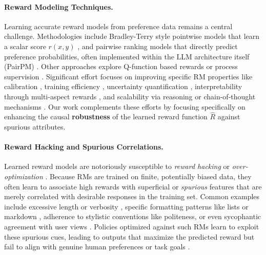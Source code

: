 \paragraph{Reward Modeling Techniques.}
Learning accurate reward models from preference data remains a central challenge. Methodologies include Bradley-Terry style pointwise models that learn a scalar score $r(x, y)$ \citep{bradley1952rank, ouyang2022training, bai2022training}, and pairwise ranking models that directly predict preference probabilities, often implemented within the LLM architecture itself (PairPM) \citep{liu2025pairwise, qin2023large}. Other approaches explore Q-function based rewards \citep{li2024process} or process supervision \citep{khalifa2025process}. Significant effort focuses on improving specific RM properties like calibration \citep{zhu2025charm, zhao2023slic}, training efficiency \citep{tunstall2023zephyr}, uncertainty quantification \citep{lou2024uncertainty}, interpretability through multi-aspect rewards \citep{wang2024interpretable, yang2024rewards}, and scalability via reasoning or chain-of-thought mechanisms \citep{zhao2025genprm}. Our work complements these efforts by focusing specifically on enhancing the causal \textbf{robustness} of the learned reward function $\hat{R}$ against spurious attributes.

\paragraph{Reward Hacking and Spurious Correlations.}
Learned reward models are notoriously susceptible to \textit{reward hacking} or \textit{over-optimization} \citep{gao2023scaling, skalse2022defining, pan2022effectsrewardmisspecificationmapping}. Because RMs are trained on finite, potentially biased data, they often learn to associate high rewards with superficial or \textit{spurious} features that are merely correlated with desirable responses in the training set. Common examples include excessive length or verbosity \citep{singhal2023long}, specific formatting patterns like lists or markdown \citep{zhang2024lists}, adherence to stylistic conventions like politeness, or even sycophantic agreement with user views \citep{denison2024sycophancy}. Policies optimized against such RMs learn to exploit these spurious cues, leading to outputs that maximize the predicted reward but fail to align with genuine human preferences or task goals \citep{shen2023trickle}.

